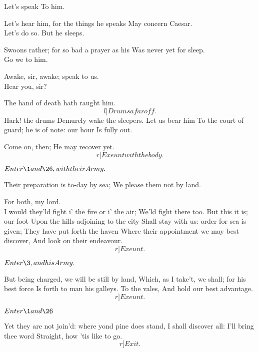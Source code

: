 \documentclass{book}
\begin{document}
	Let's speak To him.

	Let's hear him, for the things he speaks
	May concern Caesar. \\

	Let's do so. But he sleeps.

	Swoons rather; for so bad a prayer as his
	Was never yet for sleep. \\

	Go we to him.

	Awake, sir, awake; speak to us. \\

	Hear you, sir?

	The hand of death hath raught him. \\
	\[l]Drums afar off.\] Hark! the drums
	Demurely wake the sleepers. Let us bear him
	To the court of guard; he is of note: our hour
	Is fully out. 

	Come on, then; He may recover yet. 	\[r]Exeunt with the body.\]





	\(Enter \1 and \26, with their Army.\)

\1	Their preparation is to-day by sea;
	We please them not by land.

 For both, my lord. \\

\1	I would they'ld fight i' the fire or i' the air;
	We'ld fight there too. But this it is; our foot
	Upon the hills adjoining to the city
	Shall stay with us: order for sea is given;
	They have put forth the haven 
	Where their appointment we may best discover,
	And look on their endeavour. 	\[r]Exeunt.\]






	\(Enter \3, and his Army.\)

\3	But being charged, we will be still by land,
	Which, as I take't, we shall; for his best force
	Is forth to man his galleys. To the vales,
	And hold our best advantage.  \[r]Exeunt.\]



	\(Enter \1 and \26\)

\1	Yet they are not join'd: where yond pine 	does stand,
	I shall discover all: I'll bring thee word
	Straight, how 'tis like to go. \\ \[r]Exit.\]
\end{document}
